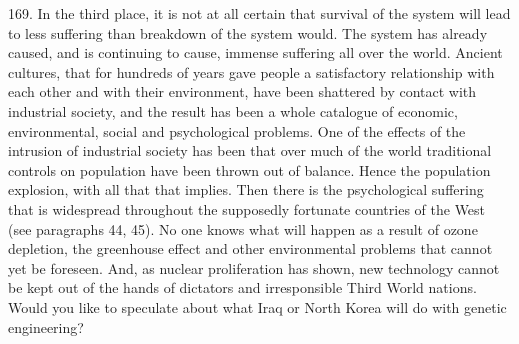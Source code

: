 \documentclass{article}
\begin{document}
169. In the third place, it is not at all certain that survival of the system will lead to less suffering 
than breakdown of the system would. The system has already caused, and is continuing to cause, 
immense suffering all over the world. Ancient cultures, that for hundreds of years gave people a 
satisfactory relationship with each other and with their environment, have been shattered by 
contact with industrial society, and the result has been a whole catalogue of economic, 
environmental, social and psychological problems. One of the effects of the intrusion of industrial 
society has been that over much of the world traditional controls on population have been thrown 
out of balance. Hence the population explosion, with all that that implies. Then there is the 
psychological suffering that is widespread throughout the supposedly fortunate countries of the 
West (see paragraphs 44, 45). No one knows what will happen as a result of ozone depletion, the 
greenhouse effect and other environmental problems that cannot yet be foreseen. And, as nuclear 
proliferation has shown, new technology cannot be kept out of the hands of dictators and 
irresponsible Third World nations. Would you like to speculate about what Iraq or North Korea 
will do with genetic engineering? \vspace{\baselineskip}
\end{document}
